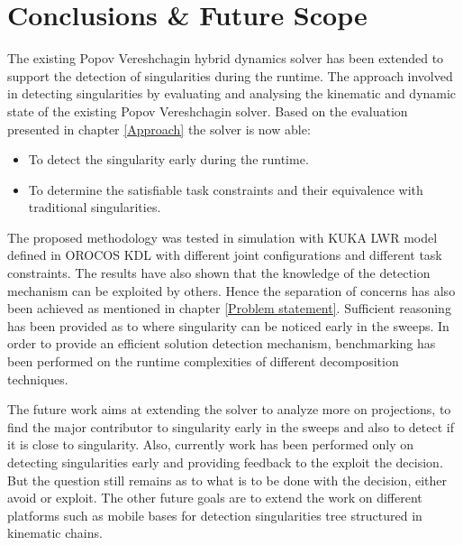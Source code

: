 
\chapter{Conclusions \& Future Scope}
\label{conclusion}
The existing Popov Vereshchagin hybrid dynamics solver has been extended to support the detection of singularities during the runtime. The approach involved in detecting singularities by evaluating and analysing the kinematic and dynamic state of the existing Popov Vereshchagin solver. Based on the evaluation presented in chapter \ref{Approach} the solver is now able:
\begin{itemize}
	\item To detect the singularity early during the runtime.
	\item To determine the satisfiable task constraints and their equivalence with traditional singularities.
\end{itemize} 


The proposed methodology was tested in simulation with KUKA LWR model defined in OROCOS KDL with different joint configurations and different task constraints. The results have also shown that the knowledge of the detection mechanism can be exploited by others. Hence the separation of concerns has also been achieved as mentioned in chapter \ref{Problem statement}. Sufficient reasoning has been provided as to where singularity can be noticed early in the sweeps. In order to provide an efficient solution detection mechanism, benchmarking has been performed on the runtime complexities of different decomposition techniques.

The future work aims at extending the solver to analyze more on projections, to find the major contributor to singularity early in the sweeps and also to detect if it is close to singularity. Also, currently work has been performed only on detecting singularities early and providing feedback to the exploit the decision. But the question still remains as to what is to be done with the decision, either avoid or exploit. The other future goals are to extend the work on different platforms such as mobile bases for detection singularities tree structured in kinematic chains. 


